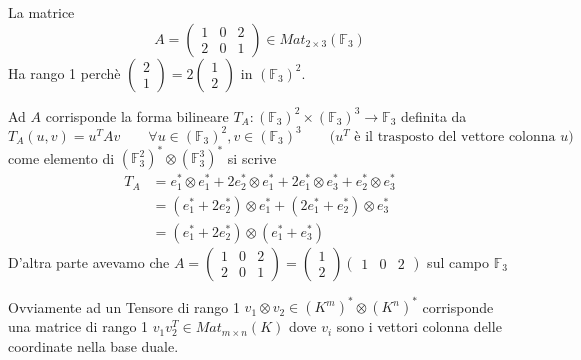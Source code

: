 \documentclass[../main.tex]{subfiles}
\begin{document}
\begin{example}
    La matrice
    \begin{equation*}
        A = \begin{pmatrix}
            1 & 0 & 2 \\
            2 & 0 & 1
        \end{pmatrix} \in Mat_{2 \times 3}(\mathbb{F}_3)
    \end{equation*}
    Ha rango 1 perchè
    $\begin{pmatrix}
            2 \\
            1
        \end{pmatrix} = 2
        \begin{pmatrix}
            1 \\
            2
        \end{pmatrix}$ in $(\mathbb{F}_3)^2$.

    Ad $A$ corrisponde la forma bilineare $T_A: (\mathbb{F}_3)^2 \times (\mathbb{F}_3)^3 \rightarrow \mathbb{F}_3$ definita da
    \begin{equation*}
        T_A(u, v) = u^T A v \qquad \forall u \in (\mathbb{F}_3)^2, v \in (\mathbb{F}_3)^3 \qquad \text{($u^T$ è il trasposto del vettore colonna $u$)}
    \end{equation*}
    come elemento di $(\mathbb{F}_3^2)^* \otimes (\mathbb{F}_3^3)^*$ si scrive
    \begin{align*}
        T_A & = e_1^* \otimes e_1^* + 2 e_2^* \otimes e_1^* + 2 e_1^* \otimes e_3^* + e_2^* \otimes e_3^* \\
            & = (e_1^* + 2 e_2^*) \otimes e_1^* + (2 e_1^* + e_2^*) \otimes e_3^*                         \\
            & = (e_1^* + 2 e_2^*) \otimes (e_1^* + e_3^*)
    \end{align*}
    D'altra parte avevamo che $A = \begin{pmatrix}
            1 & 0 & 2 \\
            2 & 0 & 1
        \end{pmatrix} = \begin{pmatrix}
            1 \\
            2
        \end{pmatrix} \begin{pmatrix}
            1 & 0 & 2
        \end{pmatrix}$ sul campo $\mathbb{F}_3$
\end{example}

Ovviamente ad un Tensore di rango 1 $v_1 \otimes v_2 \in (K^m)^* \otimes (K^n)^*$ corrisponde una matrice di rango 1 $v_1 v_2^T \in Mat_{m \times n}(K)$ dove $v_i$ sono i vettori colonna delle coordinate nella base duale.
\end{document}
